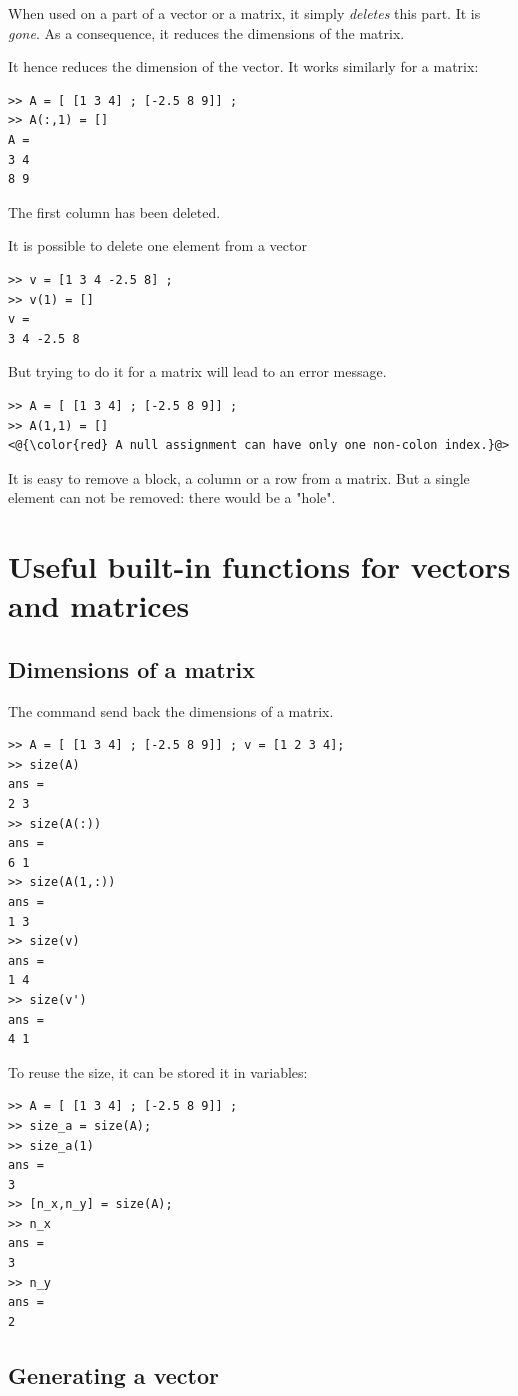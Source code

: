 				When used on a part of a vector or a matrix, it simply \emph{deletes} this part.
				It is \emph{gone}.
				As a consequence, it reduces the dimensions of the matrix.

				It hence reduces the dimension of the vector. It works similarly for a matrix:
\begin{lstlisting}
>> A = [ [1 3 4] ; [-2.5 8 9]] ;
>> A(:,1) = []
A = 
3 4
8 9
\end{lstlisting}
				The first column has been deleted.

				It is possible to delete one element from a vector 
\begin{lstlisting}
>> v = [1 3 4 -2.5 8] ;
>> v(1) = []
v = 
3 4 -2.5 8
\end{lstlisting}
				But trying to do it for a matrix will lead to an error message.
\begin{lstlisting}
>> A = [ [1 3 4] ; [-2.5 8 9]] ;
>> A(1,1) = []
<@{\color{red} A null assignment can have only one non-colon index.}@>
\end{lstlisting}
				It is easy to remove a block, a column or a row from a matrix. 
				But a single element can not be removed:  there would be a "hole".


\section{Useful built-in functions for vectors and matrices}
	\subsection{Dimensions of a matrix}
		The command  send back the dimensions of a matrix.
\begin{lstlisting}
>> A = [ [1 3 4] ; [-2.5 8 9]] ; v = [1 2 3 4];
>> size(A)
ans = 
2 3
>> size(A(:))
ans =
6 1
>> size(A(1,:))
ans =
1 3
>> size(v)
ans = 
1 4
>> size(v')
ans = 
4 1
\end{lstlisting}
		To reuse the size, it can be stored it in variables:
\begin{lstlisting}
>> A = [ [1 3 4] ; [-2.5 8 9]] ; 
>> size_a = size(A);
>> size_a(1)
ans =
3
>> [n_x,n_y] = size(A);
>> n_x
ans = 
3
>> n_y
ans = 
2
\end{lstlisting}

	\subsection{Generating a vector}

